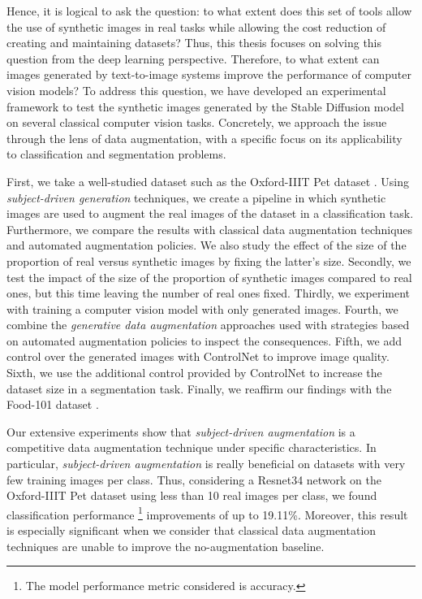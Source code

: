 Hence, it is logical to ask the question: to what extent does this set of tools allow the use of synthetic images in real tasks while allowing the cost reduction of creating and maintaining datasets? Thus, this thesis focuses on solving this question from the deep learning perspective. Therefore, to what extent can images generated by text-to-image systems improve the performance of computer vision models? To address this question, we have developed an experimental framework to test the synthetic images generated by the Stable Diffusion model on several classical computer vision tasks. Concretely, we approach the issue through the lens of data augmentation, with a specific focus on its applicability to classification and segmentation problems.

First, we take a well-studied dataset such as the Oxford-IIIT Pet dataset \cite{Parkhi2012CatsAD}. Using \textit{subject-driven generation} techniques, we create a pipeline in which synthetic images are used to augment the real images of the dataset in a classification task. Furthermore, we compare the results with classical data augmentation techniques and automated augmentation policies. We also study the effect of the size of the proportion of real versus synthetic images by fixing the latter's size. Secondly, we test the impact of the size of the proportion of synthetic images compared to real ones, but this time leaving the number of real ones fixed. Thirdly, we experiment with training a computer vision model with only generated images. Fourth, we combine the \textit{generative data augmentation} approaches used with strategies based on automated augmentation policies to inspect the consequences. Fifth, we add control over the generated images with ControlNet to improve image quality. Sixth, we use the additional control provided by ControlNet to increase the dataset size in a segmentation task. Finally, we reaffirm our findings with the Food-101 dataset \cite{bossard14}.

Our extensive experiments show that \textit{subject-driven augmentation} is a competitive data augmentation technique under specific characteristics. In particular, \textit{subject-driven augmentation} is really beneficial on datasets with very few training images per class. Thus, considering a Resnet34 network on the Oxford-IIIT Pet dataset using less than 10 real images per class, we found classification performance \footnote{The model performance metric considered is accuracy.} improvements of up to 19.11\%. Moreover, this result is especially significant when we consider that classical data augmentation techniques are unable to improve the no-augmentation baseline. 

